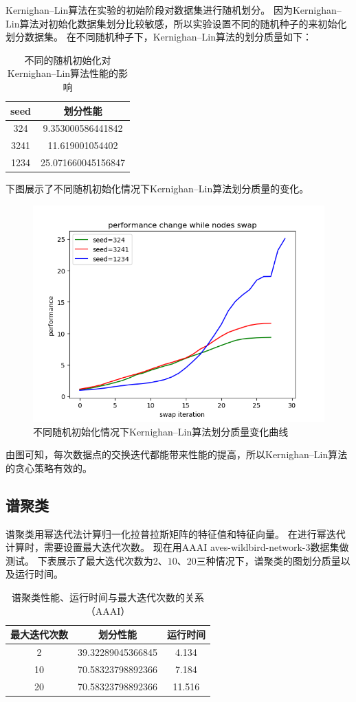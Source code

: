 Kernighan–Lin算法在实验的初始阶段对数据集进行随机划分。
因为Kernighan–Lin算法对初始化数据集划分比较敏感，所以实验设置不同的随机种子的来初始化划分数据集。
在不同随机种子下，Kernighan–Lin算法的划分质量如下：

\begin{table}[htbp]
    \centering
    \begin{tabular}{cc}
        \hline
        seed  &划分性能\\
        \hline
        324   &9.353000586441842\\
        3241  &11.619001054402\\
        1234  &25.071660045156847\\
        \hline
    \end{tabular}
    \caption{不同的随机初始化对Kernighan–Lin算法性能的影响}
\end{table}

下图展示了不同随机初始化情况下Kernighan–Lin算法划分质量的变化。

\begin{figure}[htbp]
    \centering
    \includegraphics[width=0.55\linewidth]{figure/KL.png}
    \caption{不同随机初始化情况下Kernighan–Lin算法划分质量变化曲线}
    \label{}
\end{figure}

由图可知，每次数据点的交换迭代都能带来性能的提高，所以Kernighan–Lin算法的贪心策略有效的。

\subsection{谱聚类}

谱聚类用幂迭代法计算归一化拉普拉斯矩阵的特征值和特征向量。
在进行幂迭代计算时，需要设置最大迭代次数。
现在用AAAI aves-wildbird-network-3数据集做测试。
下表展示了最大迭代次数为$2$、$10$、$20$三种情况下，谱聚类的图划分质量以及运行时间。

\begin{table}[htbp]
    \centering
    \begin{tabular}{ccc}
        \hline
        最大迭代次数 &划分性能&运行时间 \\
        \hline
        2           &39.32289045366845    &4.134 \\
        10          &70.58323798892366    &7.184 \\
        20           &70.58323798892366    &11.516 \\
        \hline
    \end{tabular}
    \caption{谱聚类性能、运行时间与最大迭代次数的关系（AAAI）}
\end{table}

